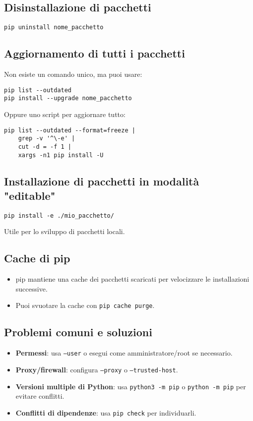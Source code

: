 \documentclass[a4paper,12pt]{article}
\begin{document}
\subsection*{Disinstallazione di pacchetti}
\begin{lstlisting}
pip uninstall nome_pacchetto
\end{lstlisting}

\subsection*{Aggiornamento di tutti i pacchetti}
Non esiste un comando unico, ma puoi usare:
\begin{lstlisting}
pip list --outdated
pip install --upgrade nome_pacchetto
\end{lstlisting}
Oppure uno script per aggiornare tutto:
\begin{lstlisting}
pip list --outdated --format=freeze |
    grep -v '^\-e' |
    cut -d = -f 1 |
    xargs -n1 pip install -U
\end{lstlisting}

\subsection*{Installazione di pacchetti in modalità "editable"}
\begin{lstlisting}
pip install -e ./mio_pacchetto/
\end{lstlisting}
Utile per lo sviluppo di pacchetti locali.

\subsection*{Cache di pip}
\begin{itemize}
    \item pip mantiene una cache dei pacchetti scaricati per velocizzare le installazioni successive.
    \item Puoi svuotare la cache con \texttt{pip cache purge}.
\end{itemize}

\subsection*{Problemi comuni e soluzioni}
\begin{itemize}
    \item \textbf{Permessi}: usa \texttt{--user} o esegui come amministratore/root se necessario.
    \item \textbf{Proxy/firewall}: configura \texttt{--proxy} o \texttt{--trusted-host}.
    \item \textbf{Versioni multiple di Python}: usa \texttt{python3 -m pip} o \texttt{python -m pip} per evitare conflitti.
    \item \textbf{Conflitti di dipendenze}: usa \texttt{pip check} per individuarli.
\end{itemize}
\end{document}
